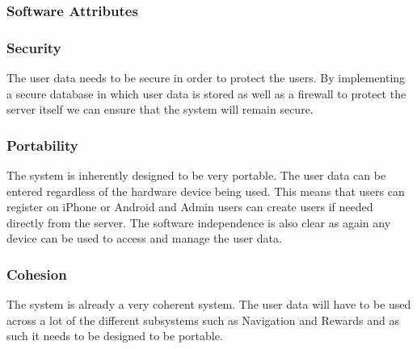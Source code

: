 \subsubsection{Software Attributes}
\subsubsection{Security}
The user data needs to be secure in order to protect the users. By implementing a secure database in which user data is stored as well as a firewall to protect the server itself we can ensure that the system will remain secure.

\subsubsection{Portability}
The system is inherently designed to be very portable. The user data can be entered regardless of the hardware device being used. This means that users can register on iPhone or Android and Admin users can create users if needed directly from the server. The software independence is also clear as again any device can be used to access and manage the user data.

\subsubsection{Cohesion}
The system is already a very coherent system. The user data will have to be used across a lot of the different subsystems such as Navigation and Rewards and as such it needs to be designed to be portable.
